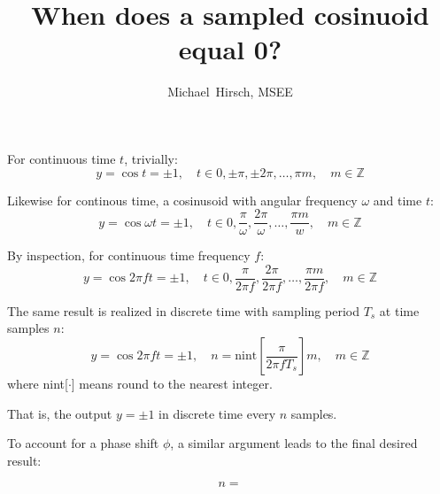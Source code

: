 \documentclass[12pt,a4paper]{article}
\author{Michael~Hirsch, MSEE }
\title{When does a sampled cosinuoid equal 0?}
\begin{document}
\maketitle

For continuous time $t$, trivially:
\[
y = \cos{t} = \pm 1, \quad t\in 0,\pm \pi, \pm 2\pi,\ldots, \pi m, \quad m\in \mathbb{Z}
\]

Likewise for continous time, a cosinusoid with angular frequency $\omega$ and time $t$:
\[
y = \cos{\omega t} = \pm 1, \quad t\in 0,\frac{\pi}{\omega},\frac{2\pi}{\omega},\ldots, \frac{\pi m}{w}, \quad m\in \mathbb{Z}
\]

By inspection, for continuous time frequency $f$:
\[
y = \cos{2\pi f t} = \pm 1, \quad t\in 0,\frac{\pi}{2 \pi f},\frac{2\pi}{2\pi f},\ldots, \frac{\pi m}{2 \pi f}, \quad m\in \mathbb{Z}
\]


The same result is realized in discrete time with sampling period $T_s$ at time samples $n$:
\[
y = \cos{2\pi f t} = \pm 1, \quad n = \textrm{nint}\left[\frac{\pi}{2\pi f T_s}\right] m, \quad m\in \mathbb{Z}
\]
where nint[$\cdot$] means round to the nearest integer.

That is, the output $y=\pm 1$ in discrete time every $n$ samples.

To account for a phase shift $\phi$, a similar argument leads to the final desired result:

\[
n = 
\]
\end{document}
